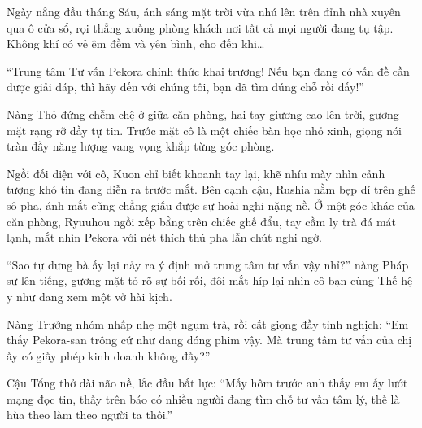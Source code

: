 \documentclass[../main.tex]{subfiles}
\begin{document}

Ngày nắng đầu tháng Sáu, ánh sáng mặt trời vừa nhú lên trên đỉnh nhà xuyên qua ô cửa sổ, rọi thẳng xuống phòng khách nơi tất cả mọi người đang tụ tập. Không khí có vẻ êm đềm và yên bình, cho đến khi\dots

``Trung tâm Tư vấn Pekora chính thức khai trương! Nếu bạn đang có vấn đề cần được giải đáp, thì hãy đến với chúng tôi, bạn đã tìm đúng chỗ rồi đấy!''

Nàng Thỏ đứng chễm chệ ở giữa căn phòng, hai tay giương cao lên trời, gương mặt rạng rỡ đầy tự tin. Trước mặt cô là một chiếc bàn học nhỏ xinh, giọng nói tràn đầy năng lượng vang vọng khắp từng góc phòng.


Ngồi đối diện với cô, Kuon chỉ biết khoanh tay lại, khẽ nhíu mày nhìn cảnh tượng khó tin đang diễn ra trước mắt. Bên cạnh cậu, Rushia nằm bẹp dí trên ghế sô-pha, ánh mắt cũng chẳng giấu được sự hoài nghi nặng nề. Ở một góc khác của căn phòng, Ryuuhou ngồi xếp bằng trên chiếc ghế đẩu, tay cầm ly trà đá mát lạnh, mắt nhìn Pekora với nét thích thú pha lẫn chút nghi ngờ.

``Sao tự dưng bà ấy lại nảy ra ý định mở trung tâm tư vấn vậy nhỉ?'' nàng Pháp sư lên tiếng, gương mặt tỏ rõ sự bối rối, đôi mắt híp lại nhìn cô bạn cùng Thế hệ y như đang xem một vở hài kịch.

Nàng Trưởng nhóm nhấp nhẹ một ngụm trà, rồi cất giọng đầy tinh nghịch: ``Em thấy Pekora-san trông cứ như đang đóng phim vậy. Mà trung tâm tư vấn của chị ấy có giấy phép kinh doanh không đấy?''

Cậu Tổng thở dài não nề, lắc đầu bất lực: ``Mấy hôm trước anh thấy em ấy lướt mạng đọc tin, thấy trên báo có nhiều người đang tìm chỗ tư vấn tâm lý, thế là hùa theo làm theo người ta thôi.''
\end{document}
